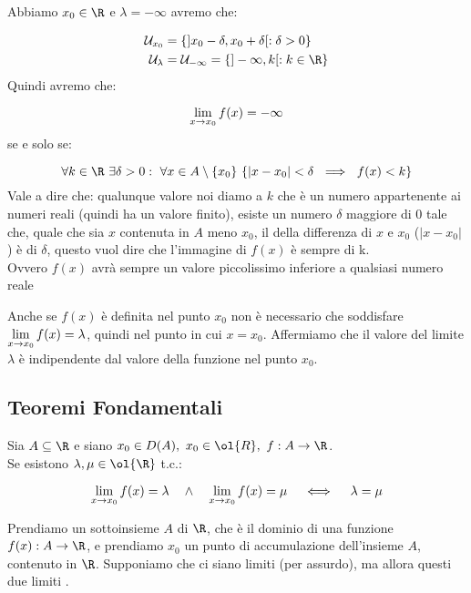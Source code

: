 \documentclass[../analisi.tex]{subfiles}
\begin{document}
\begin{esem}
Abbiamo $x_0 \in \R$ e $ \lambda = - \infty$ avremo che:

\begin{equation}
	\begin{aligned}
	\mathcal{U}_{x_0} &= \{ ] x_0 - \delta, x_0 + \delta[ : \delta > 0\}\\
	\mathcal{U}_{\lambda} &= \mathcal{U}_{- \infty} = \{
	] -\infty, k [: k \in \R \}	
	\end{aligned}
\end{equation}
Quindi avremo che:

\begin{equation}
	\lim \limits_{x \to x_0} f(x) = - \infty
\end{equation}
se e solo se:

\begin{equation}
	\forall k \in \R\ \exists \delta > 0 :\ \forall x \in A \setminus \{
	x_0 \} \ \{ | x - x_0 | < \delta\ \implies\ f(x) < k\}
\end{equation}
Vale a dire che: qualunque valore noi diamo a $k$ che è un numero appartenente 
ai numeri reali (quindi ha un valore finito), esiste un  numero $\delta$ maggiore di
0 tale che, quale che sia $x$ contenuta in $A$ meno $x_0$, il  della
differenza di $x$ e $x_0$ ($| x - x_0 |$) è  di $\delta$, questo vuol
dire che l'immagine di $f(x)$ è sempre  di k.\\
Ovvero $f(x)$ avrà sempre un valore piccolissimo inferiore a qualsiasi numero reale

\end{esem}

Anche se $f(x)$ è definita nel punto $x_0$ non è necessario
che  soddisfare $\lim \limits_{x \to x_0} f(x) = \lambda$, quindi nel punto in cui 
$x = x_0$. Affermiamo che il valore del limite $\lambda$ è indipendente 
dal valore della funzione nel punto $x_0$.


\subsection{Teoremi Fondamentali}%
\label{sub:teoremi_fondamentali}


\begin{defn}
Sia $\acr$ e siano $x_0 \in D(A),\ x_0 \in \ol{R},\ f: A \to \R$. \\
Se esistono $ \lambda, \mu \in \ol{\R}$ t.c.:


\begin{equation}
	\lim \limits_{x \to x_0} f(x) = \lambda \quad \land \quad  \lim \limits_{x \to x_0} f(x) = \mu \quad 
	\iff \quad \lambda = \mu
\end{equation}
\end{defn}
Prendiamo un sottoinsieme $A$ di $\R$, che è il dominio di una funzione $f(x): A 
\to \R$, e prendiamo $x_0$ un punto di accumulazione dell'insieme $A$, contenuto 
in $\R$. Supponiamo che ci siano  limiti  (per assurdo), ma allora questi 
due limiti .
\end{document}
